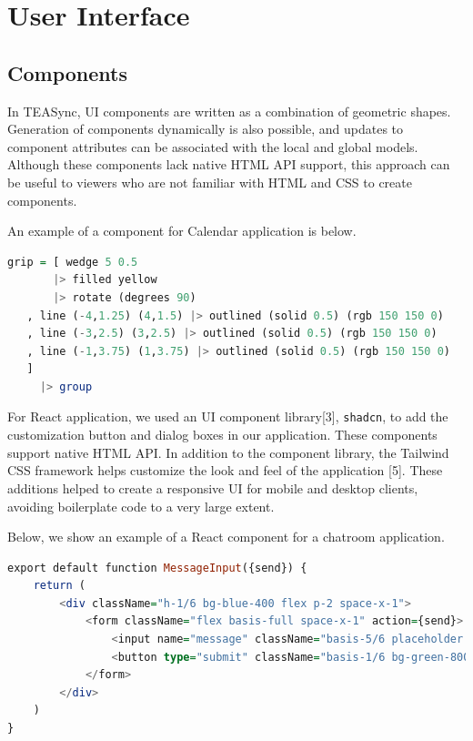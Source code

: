 
\chapter{User Interface}
\label{chap:user_interface}
\section{Components}
In TEASync, UI components are written as a combination of geometric shapes. Generation of components dynamically is also possible, and updates to component attributes can be associated with the local and global models. Although these components lack native HTML API support, this approach can be useful to viewers who are not familiar with HTML and CSS to create components.


An example of a component for Calendar application is below.

\begin{lstlisting}[language=Haskell, caption=Defining a shape component in TEASync., label=lst:java]
grip = [ wedge 5 0.5
       |> filled yellow 
       |> rotate (degrees 90)
   , line (-4,1.25) (4,1.5) |> outlined (solid 0.5) (rgb 150 150 0)    
   , line (-3,2.5) (3,2.5) |> outlined (solid 0.5) (rgb 150 150 0)    
   , line (-1,3.75) (1,3.75) |> outlined (solid 0.5) (rgb 150 150 0)    
   ]
     |> group
\end{lstlisting}

For React application, we used an UI component library[3], \lstinline{shadcn}, to add the customization button and dialog boxes in our application. These components support native HTML API. In addition to the component library, the Tailwind\cite{tailwindcss} CSS framework helps customize the look and feel of the application [5]. These additions helped to create a responsive UI for mobile and desktop clients, avoiding boilerplate code to a very large extent. 

Below, we show an example of a React component for a chatroom application.

\begin{lstlisting}[language=Haskell, caption=Defining a component in React., label=lst:java]
export default function MessageInput({send}) {
    return (
        <div className="h-1/6 bg-blue-400 flex p-2 space-x-1">
            <form className="flex basis-full space-x-1" action={send}>
                <input name="message" className="basis-5/6 placeholder:italic" placeholder="type..." type="text" />
                <button type="submit" className="basis-1/6 bg-green-800 w-1/6 h-full rounded text-fuchsia-100">Send</button>
            </form>
        </div>
    )
}
\end{lstlisting}

